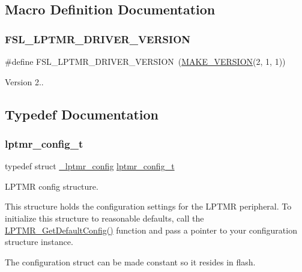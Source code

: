 \subsection{Macro Definition Documentation}
\mbox{\label{group__lptmr_ga2418e533da0b331dbcc7b04ebf90b54e}} 
\subsubsection{\texorpdfstring{FSL\_LPTMR\_DRIVER\_VERSION}{FSL\_LPTMR\_DRIVER\_VERSION}}
{\footnotesize\ttfamily \#define F\+S\+L\+\_\+\+L\+P\+T\+M\+R\+\_\+\+D\+R\+I\+V\+E\+R\+\_\+\+V\+E\+R\+S\+I\+ON~(\mbox{\hyperlink{group__ftfx__utilities_ga812138aa3315b0c6953c1a26130bcc37}{M\+A\+K\+E\+\_\+\+V\+E\+R\+S\+I\+ON}}(2, 1, 1))}

Version 2.. 

\subsection{Typedef Documentation}
\mbox{\label{group__lptmr_gad0d6720b03ee0674c139c7b9bb3d0419}} 
\subsubsection{\texorpdfstring{lptmr\_config\_t}{lptmr\_config\_t}}
{\footnotesize\ttfamily typedef struct \mbox{\hyperlink{struct__lptmr__config}{\+\_\+lptmr\+\_\+config}}  \mbox{\hyperlink{group__lptmr_gad0d6720b03ee0674c139c7b9bb3d0419}{lptmr\+\_\+config\+\_\+t}}}



L\+P\+T\+MR config structure. 

This structure holds the configuration settings for the L\+P\+T\+MR peripheral. To initialize this structure to reasonable defaults, call the \mbox{\hyperlink{group__lptmr_ga11a8100adcd8f9f0cf167b2d84a51d11}{L\+P\+T\+M\+R\+\_\+\+Get\+Default\+Config()}} function and pass a pointer to your configuration structure instance.

The configuration struct can be made constant so it resides in flash. \mbox{\label{group__lptmr_ga63bfd703c032aeb0820e8131c4720cb8}} 
